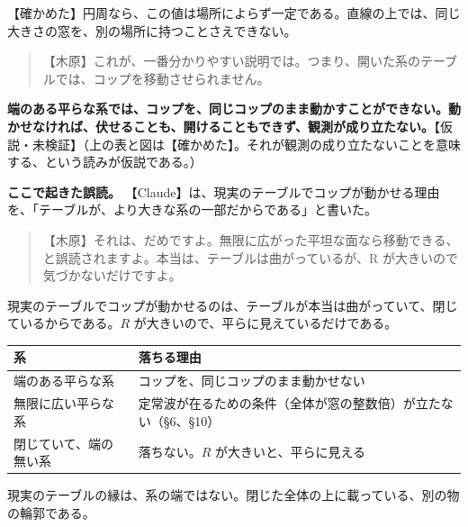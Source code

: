 \documentclass[
  a4paper,
]{ltjsarticle}
\newcounter{none} %
\begin{document}
【確かめた】円周なら、この値は場所によらず一定である。直線の上では、同じ大きさの窓を、別の場所に持つことさえできない。

\begin{quote}
【木原】これが、一番分かりやすい説明では。つまり、開いた系のテーブルでは、コップを移動させられません。
\end{quote}

\textbf{端のある平らな系では、コップを、同じコップのまま動かすことができない。動かせなければ、伏せることも、開けることもできず、観測が成り立たない。}【仮説・未検証】（上の表と図は【確かめた】。それが観測の成り立たないことを意味する、という読みが仮説である。）

\textbf{ここで起きた誤読。}
【Claude】は、現実のテーブルでコップが動かせる理由を、「テーブルが、より大きな系の一部だからである」と書いた。

\begin{quote}
【木原】それは、だめですよ。無限に広がった平坦な面なら移動できる、と誤読されますよ。本当は、テーブルは曲がっているが、R
が大きいので気づかないだけですよ。
\end{quote}

現実のテーブルでコップが動かせるのは、テーブルが本当は曲がっていて、閉じているからである。\(R\)
が大きいので、平らに見えているだけである。

{\def\LTcaptype{none} %
\begin{longtable}[]{@{}
  >{\raggedright\arraybackslash}p{}
  >{\raggedright\arraybackslash}p{}@{}}
\toprule\noalign{}
\begin{minipage}[b]{\linewidth}\raggedright
系
\end{minipage} & \begin{minipage}[b]{\linewidth}\raggedright
落ちる理由
\end{minipage} \\
\midrule\noalign{}
\endhead
\bottomrule\noalign{}
\endlastfoot
端のある平らな系 & コップを、同じコップのまま動かせない \\
無限に広い平らな系 &
定常波が在るための条件（全体が窓の整数倍）が立たない（§6、§10） \\
閉じていて、端の無い系 & 落ちない。\(R\) が大きいと、平らに見える \\
\end{longtable}
}

現実のテーブルの縁は、系の端ではない。閉じた全体の上に載っている、別の物の輪郭である。
\end{document}
